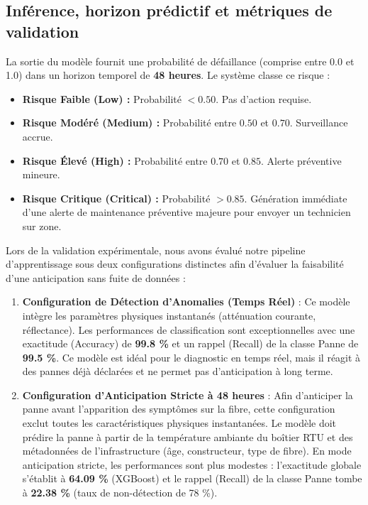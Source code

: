 \documentclass[11pt,a4paper]{article}
\begin{document}
\subsection{Inférence, horizon prédictif et métriques de validation}
La sortie du modèle fournit une probabilité de défaillance (comprise entre 0.0 et 1.0) dans un horizon temporel de \textbf{48 heures}. Le système classe ce risque :
\begin{itemize}
    \item \textbf{Risque Faible (Low) :} Probabilité $< 0.50$. Pas d'action requise.
    \item \textbf{Risque Modéré (Medium) :} Probabilité entre $0.50$ et $0.70$. Surveillance accrue.
    \item \textbf{Risque Élevé (High) :} Probabilité entre $0.70$ et $0.85$. Alerte préventive mineure.
    \item \textbf{Risque Critique (Critical) :} Probabilité $> 0.85$. Génération immédiate d'une alerte de maintenance préventive majeure pour envoyer un technicien sur zone.
\end{itemize}

Lors de la validation expérimentale, nous avons évalué notre pipeline d'apprentissage sous deux configurations distinctes afin d'évaluer la faisabilité d'une anticipation sans fuite de données :

\begin{enumerate}
    \item \textbf{Configuration de Détection d'Anomalies (Temps Réel)} : Ce modèle intègre les paramètres physiques instantanés (atténuation courante, réflectance). Les performances de classification sont exceptionnelles avec une exactitude (Accuracy) de \textbf{99.8 \%} et un rappel (Recall) de la classe Panne de \textbf{99.5 \%}. Ce modèle est idéal pour le diagnostic en temps réel, mais il réagit à des pannes déjà déclarées et ne permet pas d'anticipation à long terme.
    
    \item \textbf{Configuration d'Anticipation Stricte à 48 heures} : Afin d'anticiper la panne avant l'apparition des symptômes sur la fibre, cette configuration exclut toutes les caractéristiques physiques instantanées. Le modèle doit prédire la panne à partir de la température ambiante du boîtier RTU et des métadonnées de l'infrastructure (âge, constructeur, type de fibre). En mode anticipation stricte, les performances sont plus modestes : l'exactitude globale s'établit à \textbf{64.09 \%} (XGBoost) et le rappel (Recall) de la classe Panne tombe à \textbf{22.38 \%} (taux de non-détection de 78 \%).
\end{enumerate}
\end{document}
